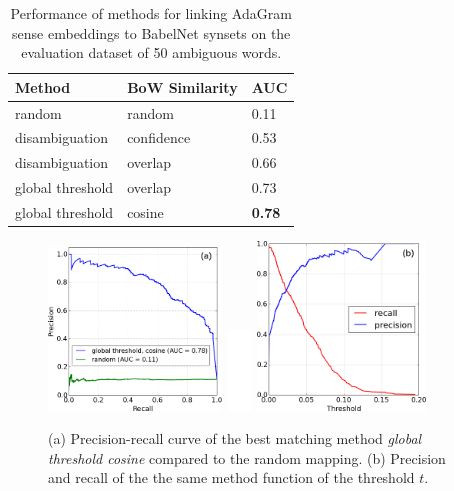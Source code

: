 \documentclass[10pt, a4paper]{article}
\begin{document}
\begin{table}

\begin{center}
\begin{tabular}{lll}


\bf  Method & \bf BoW Similarity & \bf AUC \\
\hline
random  & random &  0.11 \\ 
disambiguation & confidence & 0.53 \\
disambiguation & overlap & 0.66 \\
global threshold & overlap  & 0.73 \\
global threshold & cosine & \bf 0.78 \\

\end{tabular}
\end{center}
\caption{ Performance of methods for linking AdaGram sense embeddings to BabelNet synsets on the evaluation dataset of 50 ambiguous words.  }
\label{tbl:auc}
\end{table}

 \begin{figure}
	\begin{center}
	\includegraphics[width=0.41\textwidth]{figures/precision-recall}
	\includegraphics[width=0.06\textwidth]{figures/filler}
	\includegraphics[width=0.40\textwidth]{figures/pr-function-of-threshold}

	\end{center}
\caption{ (a) Precision-recall curve of the best matching method \textit{global threshold cosine} compared to the random mapping. (b) Precision and recall of the the same method function of the threshold $t$.}
	\label{fig:pr}
	
	\end{figure}
\end{document}
